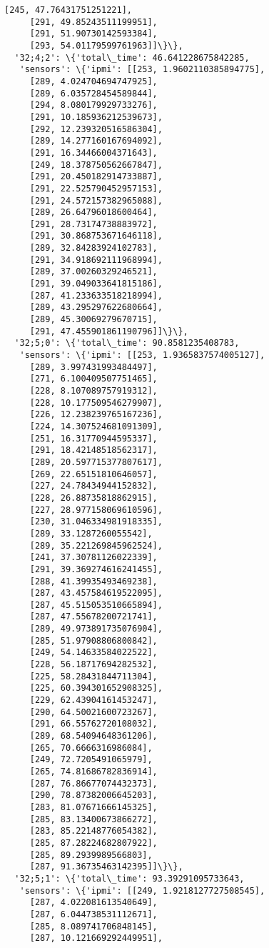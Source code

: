 \documentclass[11pt]{article}
\begin{document}
\begin{tcolorbox}[breakable, size=fbox, boxrule=.5pt, pad at break*=1mm, opacityfill=0]
\begin{Verbatim}[commandchars=\\\{\}]
     [245, 47.76431751251221],
     [291, 49.85243511199951],
     [291, 51.90730142593384],
     [293, 54.01179599761963]]\}\},
  '32;4;2': \{'total\_time': 46.641228675842285,
   'sensors': \{'ipmi': [[253, 1.9602110385894775],
     [289, 4.024704694747925],
     [289, 6.035728454589844],
     [294, 8.080179929733276],
     [291, 10.185936212539673],
     [292, 12.239320516586304],
     [289, 14.277160167694092],
     [291, 16.34466004371643],
     [249, 18.378750562667847],
     [291, 20.450182914733887],
     [291, 22.525790452957153],
     [291, 24.572157382965088],
     [289, 26.64796018600464],
     [291, 28.73174738883972],
     [291, 30.868753671646118],
     [289, 32.84283924102783],
     [291, 34.918692111968994],
     [289, 37.00260329246521],
     [291, 39.049033641815186],
     [287, 41.233633518218994],
     [289, 43.295297622680664],
     [289, 45.30069279670715],
     [291, 47.455901861190796]]\}\},
  '32;5;0': \{'total\_time': 90.8581235408783,
   'sensors': \{'ipmi': [[253, 1.9365837574005127],
     [289, 3.997431993484497],
     [271, 6.100409507751465],
     [228, 8.107089757919312],
     [228, 10.177509546279907],
     [226, 12.238239765167236],
     [224, 14.307524681091309],
     [251, 16.31770944595337],
     [291, 18.42148518562317],
     [289, 20.597715377807617],
     [269, 22.65151810646057],
     [227, 24.78434944152832],
     [228, 26.88735818862915],
     [227, 28.977158069610596],
     [230, 31.046334981918335],
     [289, 33.1287260055542],
     [289, 35.221269845962524],
     [241, 37.30781126022339],
     [291, 39.369274616241455],
     [288, 41.39935493469238],
     [287, 43.457584619522095],
     [287, 45.515053510665894],
     [287, 47.55678200721741],
     [289, 49.973891735076904],
     [285, 51.97908806800842],
     [249, 54.14633584022522],
     [228, 56.18717694282532],
     [225, 58.28431844711304],
     [225, 60.394301652908325],
     [229, 62.43904161453247],
     [290, 64.50021600723267],
     [291, 66.55762720108032],
     [289, 68.54094648361206],
     [265, 70.6666316986084],
     [249, 72.7205491065979],
     [265, 74.81686782836914],
     [287, 76.86677074432373],
     [290, 78.87382006645203],
     [283, 81.07671666145325],
     [285, 83.13400673866272],
     [283, 85.22148776054382],
     [285, 87.28224682807922],
     [285, 89.2939989566803],
     [287, 91.36735463142395]]\}\},
  '32;5;1': \{'total\_time': 93.39291095733643,
   'sensors': \{'ipmi': [[249, 1.9218127727508545],
     [287, 4.022081613540649],
     [287, 6.044738531112671],
     [285, 8.089741706848145],
     [287, 10.121669292449951],

\end{Verbatim}
\end{tcolorbox}
\end{document}
